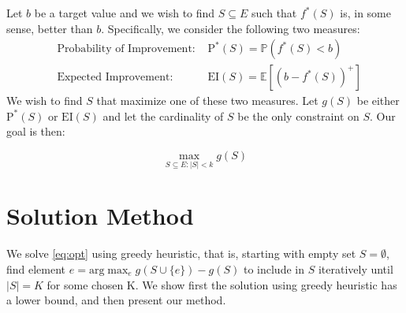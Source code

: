 \documentclass[11pt]{article}
\newcommand{\E}{\mathbb{E}}
\newcommand{\EI}{\mathrm{EI}}
\newcommand{\PI}{\text{P}^*}
\begin{document}
%
%

Let $b$ be a target value and we wish to find $S\subseteq E$ such that $f^*(S)$ is, in some sense, better than $b$. Specifically, we consider the following two measures:
\begin{equation} \label{eq:twomeasure}
\begin{aligned}
&\text{Probability of Improvement: }&\PI(S) = \mathbb{P}(f^*(S) < b)\\
&\text{Expected Improvement: }&\EI(S) = \E [(b-f^*(S))^+]
\end{aligned}
\end{equation}
We wish to find $S$ that maximize one of these two measures. Let $g(S)$ be either $\PI(S)$ or $\EI(S)$ and let the cardinality of $S$ be the only constraint on $S$. Our goal is then:

\begin{equation} \label{eq:opt}
\max_{S\subseteq E:|S|<k}g(S)
\end{equation}

\section{Solution Method}
We solve \eqref{eq:opt} using greedy heuristic, that is, starting with empty set $S=\emptyset$, find element $e = \mathrm{arg}\max_e g(S \cup \{e\})-g(S)$ to include in $S$ iteratively until $|S|=K$ for some chosen K. We show first the solution using greedy heuristic has a lower bound, and then present our method.
\end{document}
